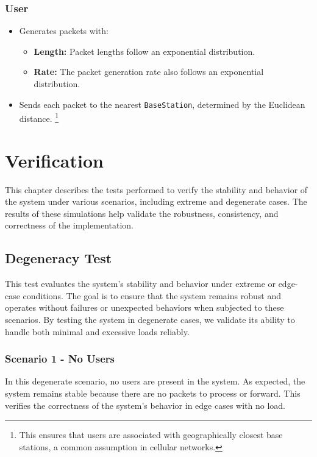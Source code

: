\documentclass{report}
\begin{document}
\subsection{User}
\begin{itemize}
    \item Generates packets with:
    \begin{itemize}
        \item \textbf{Length:} Packet lengths follow an exponential distribution.
        \item \textbf{Rate:} The packet generation rate also follows an exponential distribution.
    \end{itemize}
    \item Sends each packet to the nearest \texttt{BaseStation}, determined by the Euclidean distance.%
    \footnote{This ensures that users are associated with geographically closest base stations, a common assumption in cellular networks.}
\end{itemize}

\chapter{Verification}
This chapter describes the tests performed to verify the stability and behavior of the system under various scenarios, including extreme and degenerate cases. The results of these simulations help validate the robustness, consistency, and correctness of the implementation.

\section{Degeneracy Test}
This test evaluates the system's stability and behavior under extreme or edge-case conditions. The goal is to ensure that the system remains robust and operates without failures or unexpected behaviors when subjected to these scenarios. By testing the system in degenerate cases, we validate its ability to handle both minimal and excessive loads reliably.

\subsection{Scenario 1 - No Users}
In this degenerate scenario, no users are present in the system. As expected, the system remains stable because there are no packets to process or forward. This verifies the correctness of the system's behavior in edge cases with no load.
\end{document}
